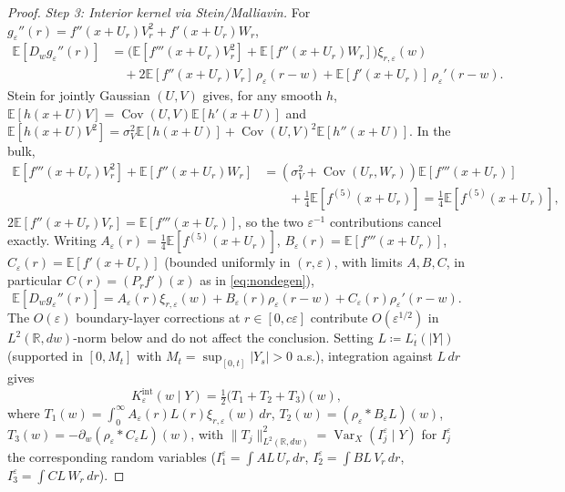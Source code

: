 \documentclass[11pt,reqno]{amsart}
\theoremstyle{plain}
\theoremstyle{definition}
\theoremstyle{remark}
\newcommand{\R}{\mathbb{R}}
\newcommand{\E}{\mathbb{E}}
\DeclareMathOperator{\Var}{Var}
\DeclareMathOperator{\Cov}{Cov}
\begin{document}
\begin{proof}
\emph{Step 3: Interior kernel via Stein/Malliavin.}
For $g_\varepsilon''(r)=f''(x+U_r)V_r^{2}+f'(x+U_r)W_r$,
\begin{equation}\label{eq:Dgpp}
\begin{aligned}
  \E[D_wg_\varepsilon''(r)]
   &=\bigl(\E[f'''(x+U_r)V_r^{2}]+\E[f''(x+U_r)W_r]\bigr)\xi_{r,\varepsilon}(w)\\
   &\quad+2\E[f''(x+U_r)V_r]\,\rho_\varepsilon(r-w)
   +\E[f'(x+U_r)]\,\rho_\varepsilon'(r-w).
\end{aligned}
\end{equation}
Stein for jointly Gaussian $(U,V)$ gives, for any smooth $h$,
$\E[h(x+U)V]=\Cov(U,V)\E[h'(x+U)]$ and
$\E[h(x+U)V^{2}]=\sigma_V^{2}\E[h(x+U)]+\Cov(U,V)^{2}\E[h''(x+U)]$.
In the bulk,
\begin{align*}
  \E[f'''(x+U_r)V_r^{2}]+\E[f''(x+U_r)W_r]
   &=(\sigma_V^{2}+\Cov(U_r,W_r))\E[f'''(x+U_r)]\\
   &\qquad+\tfrac14\E[f^{(5)}(x+U_r)]
   =\tfrac14\E[f^{(5)}(x+U_r)],
\end{align*}
$2\E[f''(x+U_r)V_r]=\E[f'''(x+U_r)]$, so the two $\varepsilon^{-1}$
contributions cancel exactly. Writing
$A_\varepsilon(r)=\tfrac14\E[f^{(5)}(x+U_r)]$,
$B_\varepsilon(r)=\E[f'''(x+U_r)]$,
$C_\varepsilon(r)=\E[f'(x+U_r)]$
(bounded uniformly in $(r,\varepsilon)$, with limits $A,B,C$, in
particular $C(r)=(P_r f')(x)$ as in \eqref{eq:nondegen}),
\begin{equation}\label{eq:Dkernel}
  \E[D_wg_\varepsilon''(r)]
  =A_\varepsilon(r)\xi_{r,\varepsilon}(w)
   +B_\varepsilon(r)\rho_\varepsilon(r-w)
   +C_\varepsilon(r)\rho_\varepsilon'(r-w).
\end{equation}
The $O(\varepsilon)$ boundary-layer corrections at $r\in[0,c\varepsilon]$
contribute $O(\varepsilon^{1/2})$ in $L^{2}(\R,dw)$-norm below and
do not affect the conclusion. Setting $L\coloneqq L_t^{\cdot}(|Y|)$
(supported in $[0,M_t]$ with $M_t=\sup_{[0,t]}|Y_s|>0$ a.s.),
integration against $L\,dr$ gives
\begin{equation}\label{eq:T123}
  K_\varepsilon^{\mathrm{int}}(w\mid Y)
   =\tfrac12\bigl(T_1+T_2+T_3\bigr)(w),
\end{equation}
where
$T_1(w)=\!\int_0^{\infty}\!A_\varepsilon(r)L(r)\xi_{r,\varepsilon}(w)\,dr$,
$T_2(w)=(\rho_\varepsilon*B_\varepsilon L)(w)$,
$T_3(w)=-\partial_w(\rho_\varepsilon*C_\varepsilon L)(w)$, with
$\|T_j\|_{L^{2}(\R,dw)}^{2}=\Var_X(I_j^\varepsilon\mid Y)$ for
$I_j^\varepsilon$ the corresponding random variables
($I_1^\varepsilon=\int AL\,U_r\,dr$,
$I_2^\varepsilon=\int BL\,V_r\,dr$,
$I_3^\varepsilon=\int CL\,W_r\,dr$).


\end{proof}
\end{document}
